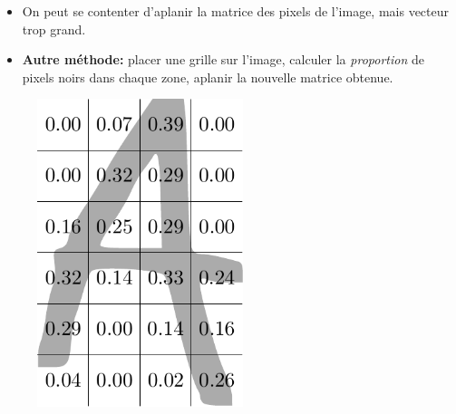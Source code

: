 \clearpage
{}

\begin{slide} 

\begin{itemize}

	\item On peut se contenter d'aplanir la matrice des pixels de l'image, mais vecteur trop grand.
	
	\item \textbf{Autre méthode:} placer une grille sur l'image, calculer la \textit{proportion} de pixels noirs dans chaque zone, aplanir la nouvelle matrice obtenue.

\end{itemize}	

\begin{figure}[h!]
	\centering
	\includegraphics[width=6cm]{schemas/vectorisation.pdf}
\end{figure}

\end{slide}